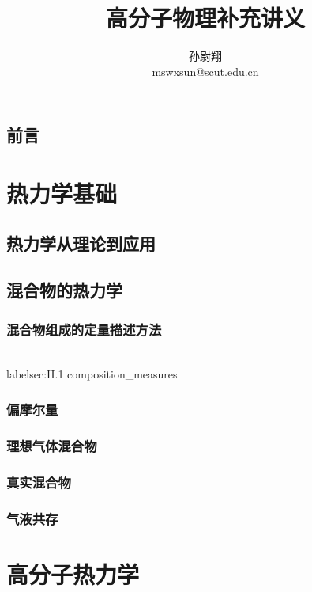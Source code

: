 \documentclass[zihao=5,linespread=1.3,b5paper,heading=true,twoside]{ctexbook}
\title{高分子物理补充讲义}
\author{孙尉翔\\mswxsun@scut.edu.cn}
\theoremstyle{definition}
\theoremstyle{plain}
\begin{document}
\maketitle
\chapter*{前言}\label{sec:preface}


\newpage\tableofcontents

\part{热力学基础}
\chapter{热力学从理论到应用}\label{sec:I_thermodynamic_relations}


\chapter{混合物的热力学}\label{sec:II 混合物的热力学}
\section{混合物组成的定量描述方法}\\label{sec:II.1 composition_measures}

\section{偏摩尔量}\label{sec:II.2 partial_molar_quantities}

\section{理想气体混合物}

\section{真实混合物}

\section{气液共存}


\part{高分子热力学}
\end{document}
